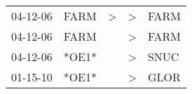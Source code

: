 \begin{supertabular}{p{0.07\textwidth}p{0.06\textwidth}p{0.02\textwidth}p{0.02\textwidth}p{0.06\textwidth}}
 04-12-06\textsuperscript{} &  FARM\textsuperscript{} &  \textgreater &  \textgreater &  FARM\textsuperscript{} \\
 04-12-06\textsuperscript{} &  FARM\textsuperscript{} &               &  \textgreater &  FARM\textsuperscript{} \\
 04-12-06\textsuperscript{} &                   *OE1* &               &  \textgreater &  SNUC\textsuperscript{} \\
 01-15-10\textsuperscript{} &                   *OE1* &               &  \textgreater &  GLOR\textsuperscript{} \\
\end{supertabular}
